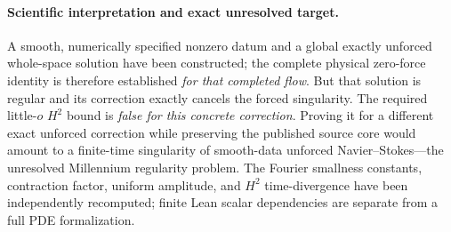 \paragraph{Scientific interpretation and exact unresolved target.}
A smooth, numerically specified nonzero datum and a global
exactly unforced whole-space solution have been constructed;
the complete physical zero-force identity is therefore
established \emph{for that completed flow}. But that solution
is regular and its correction exactly cancels the forced
singularity. The required little-$o$ $H^2$ bound is
\emph{false for this concrete correction}. Proving it for
a different exact unforced correction while preserving
the published source core would amount to a finite-time
singularity of smooth-data unforced Navier--Stokes---the
unresolved Millennium regularity problem.
The Fourier smallness constants, contraction factor,
uniform amplitude, and $H^2$ time-divergence have been
independently recomputed; finite Lean scalar dependencies
are separate from a full PDE formalization.


